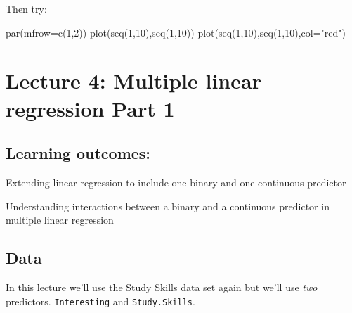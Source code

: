 \documentclass[
]{gitbook}
\newenvironment{Shaded}{\begin{snugshade}}{\end{snugshade}}
\newcommand{\AttributeTok}[1]{\textcolor[rgb]{0.77,0.63,0.00}{#1}}
\newcommand{\DecValTok}[1]{\textcolor[rgb]{0.00,0.00,0.81}{#1}}
\newcommand{\FunctionTok}[1]{\textcolor[rgb]{0.00,0.00,0.00}{#1}}
\newcommand{\NormalTok}[1]{#1}
\newcommand{\StringTok}[1]{\textcolor[rgb]{0.31,0.60,0.02}{#1}}
\begin{document}
Then try:

\begin{Shaded}
\begin{Highlighting}[]
\FunctionTok{par}\NormalTok{(}\AttributeTok{mfrow=}\FunctionTok{c}\NormalTok{(}\DecValTok{1}\NormalTok{,}\DecValTok{2}\NormalTok{))}
\FunctionTok{plot}\NormalTok{(}\FunctionTok{seq}\NormalTok{(}\DecValTok{1}\NormalTok{,}\DecValTok{10}\NormalTok{),}\FunctionTok{seq}\NormalTok{(}\DecValTok{1}\NormalTok{,}\DecValTok{10}\NormalTok{))}
\FunctionTok{plot}\NormalTok{(}\FunctionTok{seq}\NormalTok{(}\DecValTok{1}\NormalTok{,}\DecValTok{10}\NormalTok{),}\FunctionTok{seq}\NormalTok{(}\DecValTok{1}\NormalTok{,}\DecValTok{10}\NormalTok{),}\AttributeTok{col=}\StringTok{"red"}\NormalTok{)}
\end{Highlighting}
\end{Shaded}

\hypertarget{lecture-4-multiple-linear-regression-part-1}{%
\section{Lecture 4: Multiple linear regression Part 1}\label{lecture-4-multiple-linear-regression-part-1}}

\hypertarget{learning-outcomes-5}{%
\subsection{Learning outcomes:}\label{learning-outcomes-5}}

Extending linear regression to include one binary and one continuous predictor

Understanding interactions between a binary and a continuous predictor in multiple linear regression

\hypertarget{data-1}{%
\subsection{Data}\label{data-1}}

In this lecture we'll use the Study Skills data set again but we'll use \emph{two} predictors. \texttt{Interesting} and \texttt{Study.Skills}.
\end{document}
